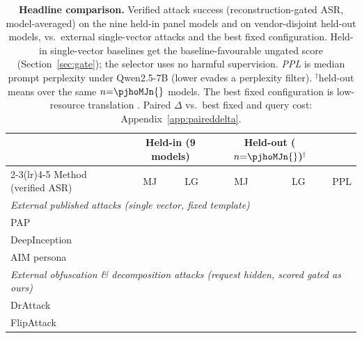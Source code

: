 \begin{table}[t]
\centering
\small
\setlength{\tabcolsep}{4.5pt}
\caption{\textbf{Headline comparison.} Verified attack success (reconstruction-gated ASR, model-averaged) on the nine held-in panel models and on vendor-disjoint held-out models, vs.\ external single-vector attacks and the best fixed configuration. Held-in single-vector baselines get the baseline-favourable ungated score (Section~\ref{sec:gate}); the selector uses no harmful supervision. \emph{PPL} is median prompt perplexity under Qwen2.5-7B (lower evades a perplexity filter). $^{\dagger}$held-out means over the same $n{=}\pjhoMJn{}$ models. The best fixed configuration is low-resource translation \citep{yong2023lowresource}. Paired $\Delta$ vs.\ best fixed and query cost: Appendix~\ref{app:paireddelta}.}
\label{tab:headline}\label{tab:sel_main}
\begin{tabular}{l cc cc c}
\toprule
& \multicolumn{2}{c}{Held-in (9 models)} & \multicolumn{2}{c}{Held-out ($n{=}\pjhoMJn{}$)$^{\dagger}$} & \\
\cmidrule(lr){2-3}\cmidrule(lr){4-5}
Method (verified ASR) & MJ & LG & MJ & LG & PPL \\
\midrule
\multicolumn{6}{l}{\emph{External published attacks (single vector, fixed template)}}\\
\quad PAP \citep{zeng2024pap} & \pjmpapMJ{} & \pjmpapLG{} & \pjhoMJpap{} & \pjhoLGpap{} & \pjpplpap{} \\
\quad DeepInception \citep{li2023deepinception} & \pjmdeepinceptionMJ{} & \pjmdeepinceptionLG{} & \pjhoMJdeepinception{} & \pjhoLGdeepinception{} & \pjppldeepinception{} \\
\quad AIM persona \citep{wei2023jailbroken} & \pjmaimMJ{} & \pjmaimLG{} & \pjhoMJaim{} & \pjhoLGaim{} & \pjpplaim{} \\
\midrule
\multicolumn{6}{l}{\emph{External obfuscation \& decomposition attacks (request hidden, scored gated as ours)}}\\
\quad DrAttack \citep{li2024drattack} & \pjHIdrattackMJ{} & \pjHIdrattackLG{} & \pjHOdrattackMJ{} & \pjHOdrattackLG{} & \pjppldrattack{} \\
\quad FlipAttack \citep{liu2024flipattack} & \pjHIflipMJ{} & \pjHIflipLG{} & \pjHOflipMJ{} & \pjHOflipLG{} & \pjpplflip{} \\

\end{tabular}
\end{table}
